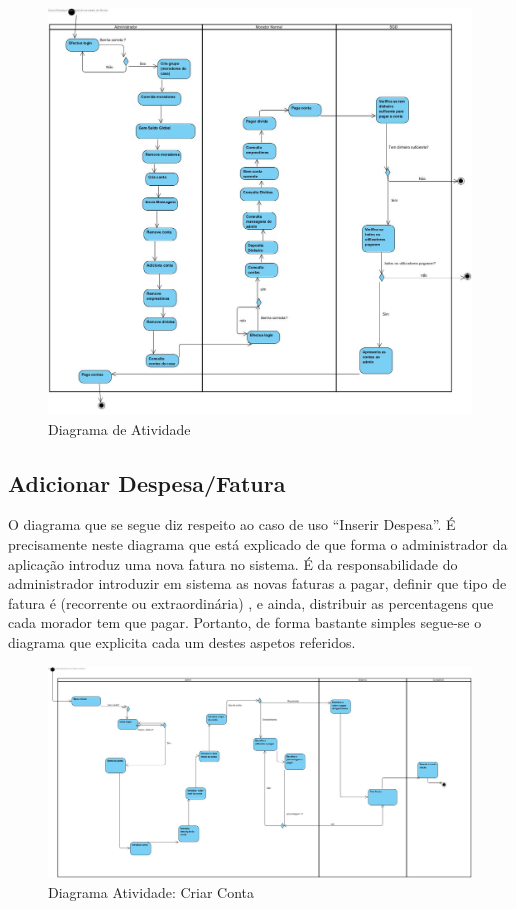 \begin{figure}[htb!]
	\centering
	\includegraphics[scale=0.37]{imagens/diagActividade/FuncionamentoDaAplicacao}  
	\caption{Diagrama de Atividade}  
\end{figure}

\newpage

\subsection{Adicionar Despesa/Fatura}
O diagrama que se segue diz respeito ao caso de uso “Inserir Despesa”. É precisamente neste diagrama que está explicado de que forma o administrador da aplicação introduz uma nova fatura no sistema. É da responsabilidade do administrador introduzir em sistema as novas faturas a pagar, definir que tipo de fatura é (recorrente ou extraordinária) ,  e ainda,  distribuir as percentagens que cada morador tem que pagar. Portanto, de forma bastante simples segue-se o diagrama que explicita cada um destes aspetos referidos.


\begin{figure}[htb!]
	\centering
	\includegraphics[scale=0.24]{imagens/diagActividade/IntroducaoDeConta}  
	\caption{Diagrama Atividade: Criar Conta}  
\end{figure}

